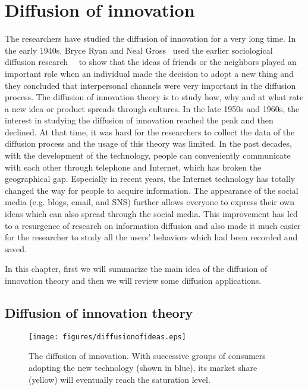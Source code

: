 \chapter{Diffusion of innovation}
\label{chap:theory}

The researchers have studied the diffusion of innovation for a very long time. In the early 1940s, Bryce Ryan and Neal Gross~\cite{ryan1943diffusion} used the earlier sociological diffusion research~\cite{bowers1938differential}~\cite{chapin1928cultural} to show that the ideas of friends or the neighbors played an important role when an individual made the decision to adopt a new thing and they concluded that interpersonal channels were very important in the diffusion process. The diffusion of innovation theory is to study how, why and at what rate a new idea or product spreads through cultures. In the late 1950s and 1960s, the interest in studying the diffusion of innovation reached the peak and then declined. At that time, it was hard for the researchers to collect the data of the diffusion process and the usage of this theory was limited. In the past decades, with the development of the technology, people can conveniently communicate with each other through telephone and Internet, which has broken the geographical gap. Especially in recent years, the Internet technology has totally changed the way for people to acquire information. The appearance of the social media (e.g. blogs, email, and SNS) further allows everyone to express their own ideas which can also spread through the social media. This improvement has led to a resurgence of research on information diffusion and also made it much easier for the researcher to study all the users' behaviors which had been recorded and saved.   

In this chapter, first we will summarize the main idea of the diffusion of innovation theory and then we will review some diffusion applications.

\section{Diffusion of innovation theory}

\begin{figure}[!htb]
  \centering
  \texttt{[image: figures/diffusionofideas.eps]}
  \caption{The diffusion of innovation. With successive groups of consumers adopting the new technology (shown in blue), its market share (yellow) will eventually reach the saturation level. ~\cite{rogers1995diffusion}}
  \label{fig:diffusionofidea}
\end{figure}

